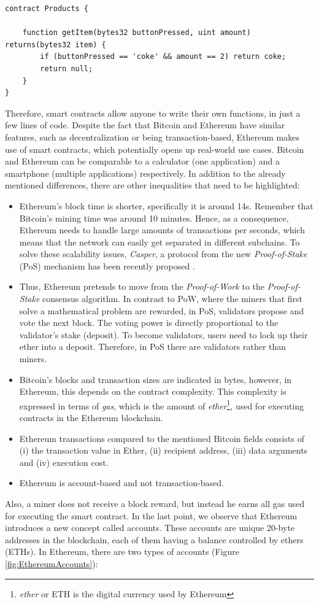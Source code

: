 \begin{lstlisting}
contract Products {

	function getItem(bytes32 buttonPressed, uint amount) returns(bytes32 item) {
		if (buttonPressed == 'coke' && amount == 2) return coke;
 		return null;
	}
}
\end{lstlisting}

Therefore, smart contracts allow anyone to write their own functions, in just a few lines of code. Despite the fact that Bitcoin and Ethereum have similar features, such as decentralization or being transaction-based, Ethereum makes use of smart contracts, which potentially opens up real-world use cases. Bitcoin and Ethereum can be comparable to a calculator (one application) and a smartphone (multiple applications) respectively. In addition to the already mentioned differences, there are other inequalities that need to be highlighted:

\begin{itemize}
	
	\item Ethereum's block time is shorter, specifically it is around 14s. Remember that Bitcoin's mining time was around 10 minutes. Hence, as a consequence, Ethereum needs to handle large amounts of transactions per seconds, which means that the network can easily get separated in different subchains. To solve these scalability issues, \textit{Casper}, a protocol from the new \textit{Proof-of-Stake} (PoS) mechanism has been recently proposed \cite{proofOfStake}.
	\item Thus, Ethereum pretends to move from the \textit{Proof-of-Work} to the \textit{Proof-of-Stake} consensus algorithm. In contrast to PoW, where the miners that first solve a mathematical problem are rewarded, in PoS, validators propose and vote the next block. The voting power is directly proportional to the validator's stake (deposit). To become validators, users need to lock up their ether into a deposit. Therefore, in PoS there are validators rather than miners.
	\item Bitcoin's blocks and transaction sizes are indicated in bytes, however, in Ethereum, this depends on the contract complexity. This complexity is expressed in terms of \textit{gas}, which is the amount of \textit{ether}\footnote{\textit{ether} or ETH is the digital currency used by Ethereum}, used for executing contracts in the Ethereum blockchain. 

	\item Ethereum transactions compared to the mentioned Bitcoin fields consists of (i) the transaction value in Ether, (ii) recipient address, (iii) data arguments and (iv) execution cost.
	\item Ethereum is account-based and not transaction-based.
\end{itemize}
Also, a miner does not receive a block reward, but instead he earns all gas used for executing the smart contract.
In the last point, we observe that Ethereum introduces a new concept called accounts. These accounts are unique 20-byte addresses in the blockchain, each of them having a balance controlled by ethers (ETHs). In Ethereum, there are two types of accounts (Figure \ref{fig:EthereumAccounts}):

